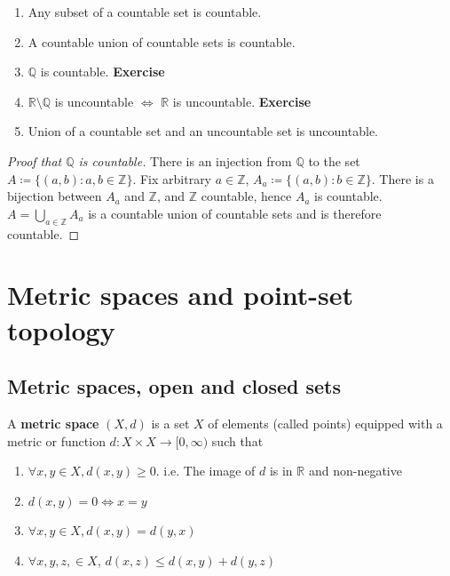 \begin{proposition}
    \hfill 
    \begin{enumerate}
        \item Any subset of a countable set is countable.
        \item A countable union of countable sets is countable.
        \item $\mathbb{Q}$ is countable. \textbf{Exercise}
        \item $\mathbb{R} \setminus \mathbb{Q}$ is uncountable $\iff$ $\mathbb{R}$ is uncountable. \textbf{Exercise}
        \item Union of a countable set and an uncountable set is uncountable. 
    \end{enumerate}
\end{proposition}

\begin{proof}[Proof that $\mathbb{Q}$ is countable]
    There is an injection from $\mathbb{Q}$  to the set $A \coloneq \{ (a, b): a, b \in \mathbb{Z} \} $. 
    Fix arbitrary $a \in \mathbb{Z}$, $A_a \coloneq \{ (a, b) : b \in \mathbb{Z} \} $. There is a bijection 
    between $A_a$ and $\mathbb{Z}$, and $\mathbb{Z}$ countable, hence $A_a$ is countable. 
    $A = \bigcup_{a \in \mathbb{Z}}A_a$ is a countable union of countable sets and is therefore countable.
\end{proof}

\newpage 

\section{Metric spaces and point-set topology}

\subsection{Metric spaces, open and closed sets}

\begin{definition}
    A \textbf{metric space} $(X, d)$ is a set $X$
    of elements (called points)
    equipped with a metric or function
    $d: X \times X \to [0, \infty)$ 
    such that 
    \begin{enumerate}
        \item $\forall x, y \in X, d(x,y) \geq 0$. 
i.e. The image of $d$ is in $\mathbb{R}$ and non-negative 
        \item $d(x,y) = 0 \iff x = y$
        \item $\forall x, y \in X, d(x,y) = d(y,x)$
        \item $\forall x, y, z, \in X$, 
$d(x,z) \leq d(x, y) + d(y, z)$
    \end{enumerate}
\end{definition}

